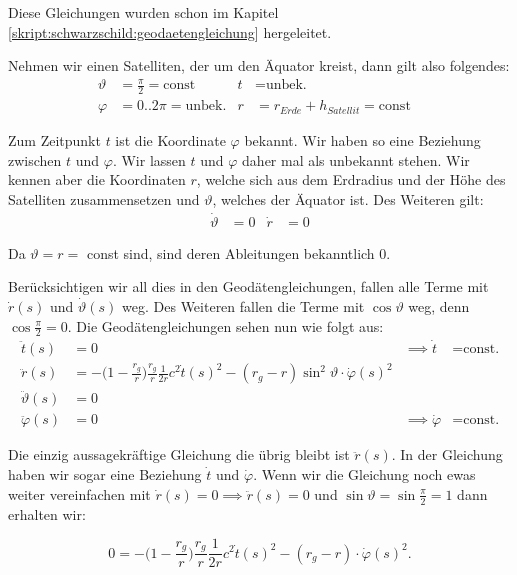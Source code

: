 \begin{refsection}
\noindent{}Diese Gleichungen wurden schon im Kapitel \ref{skript:schwarzschild:geodaetengleichung} hergeleitet. 

Nehmen wir einen Satelliten, der um den Äquator kreist, dann gilt also folgendes:
\begin{align*}
\vartheta &= \frac{\pi}{2} = \text{const} & 
t & = \text{unbek.} & \\
\varphi &= 0..2\pi = \text{unbek.} &
r &= r_{Erde} + h_{Satellit} = \text{const}
\end{align*}

\noindent{}Zum Zeitpunkt $t$ ist die Koordinate $\varphi$ bekannt. Wir haben so eine Beziehung zwischen $t$ und $\varphi$. Wir lassen $t$ und \( \varphi \) daher mal als unbekannt stehen. Wir kennen aber die Koordinaten \(  r \), welche sich aus dem Erdradius und der Höhe des Satelliten zusammensetzen und \( \vartheta \), welches der Äquator ist. Des Weiteren gilt:
\begin{align*}
\dot \vartheta &= 0 & 
\dot r &= 0
\end{align*}

\noindent{}Da $\vartheta = r =$ const sind, sind deren Ableitungen bekanntlich 0.

 Berücksichtigen wir all dies in den Geodätengleichungen, fallen alle Terme mit \( \dot r(s) \) und \( \dot \vartheta (s) \) weg. Des Weiteren fallen die Terme mit \( \cos \vartheta \) weg, denn \( \cos \frac{\pi}{2} = 0 \). Die Geodätengleichungen sehen nun wie folgt aus:
\begin{align*}
\ddot t(s) &= 0 & \implies \dot t &= \text{const.}\\
\ddot r(s)
&=
-\biggl(1-\frac{r_g}{r}\biggr)\frac{r_g}{r}\frac1{2r}c^2\dot t(s)^2
- (r_g-r)\sin^2 \vartheta \cdot \dot \varphi(s)^2 \\
\ddot \vartheta(s) &= 0 \\
\ddot \varphi(s) &= 0 & \implies \dot \varphi & = \text{const.}
\end{align*}

\noindent{}Die einzig aussagekräftige Gleichung die übrig bleibt ist \( \ddot r(s) \). In der Gleichung haben wir sogar eine Beziehung \( \dot t \) und \( \dot \varphi \). Wenn wir die Gleichung noch ewas weiter vereinfachen mit \( \dot r(s) = 0 \implies \ddot r(s) = 0 \) und \( \sin \vartheta = \sin \frac{\pi}{2} = 1 \) dann erhalten wir:

\begin{equation}
0 = -\biggl(1-\frac{r_g}{r}\biggr)\frac{r_g}{r}\frac1{2r}c^2\dot t(s)^2 - (r_g-r)\cdot \dot \varphi(s)^2.
\end{equation}


\end{refsection}
